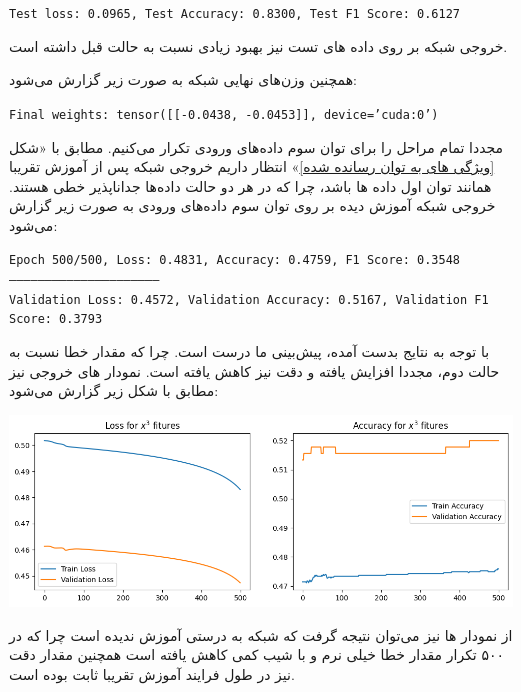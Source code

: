 \begin{enumerate}
\begin{qsolve}
		\begin{latin}
			\texttt{Test loss: 0.0965, Test Accuracy: 0.8300, Test F1 Score: 0.6127}\\
		\end{latin}
		
		خروجی شبکه بر روی داده های تست نیز بهبود زیادی نسبت به حالت قبل داشته است.
		
		همچنین وزن‌های نهایی شبکه به صورت زیر گزارش می‌شود:
		\begin{latin}
			\texttt{Final weights: tensor([[-0.0438, -0.0453]], device='cuda:0')}\\
		\end{latin}
		
		
		مجددا تمام مراحل را برای توان سوم داده‌های ورودی تکرار می‌کنیم. مطابق با «شکل \ref{ویژگی های به توان رسانده شده}» انتظار داریم خروجی شبکه پس از آموزش تقریبا همانند توان اول داده ها باشد، چرا که در هر دو حالت داده‌ها جداناپذیر خطی هستند. خروجی شبکه آموزش دیده بر روی توان سوم داده‌های ورودی به صورت زیر گزارش می‌شود:
		
		\begin{latin}
			\texttt{Epoch 500/500, Loss: 0.4831, Accuracy: 0.4759, F1 Score: 0.3548}\\
			\texttt{---------------------------------------------------------------}\\
			\texttt{Validation Loss: 0.4572, Validation Accuracy: 0.5167, Validation F1 Score: 0.3793}
		\end{latin}
		
		با توجه به نتایج بدست آمده، پیش‌بینی ما درست است. چرا که مقدار خطا نسبت به حالت دوم، مجددا افزایش یافته و دقت نیز کاهش یافته است. نمودار های خروجی نیز مطابق با شکل زیر گزارش می‌شود:
		
		\begin{center}
			\includegraphics*[width=1\linewidth]{pics/img13.png}
			\label{نمودار‌های خطا و دقت ۳}
		\end{center}
		
		از نمودار ها نیز می‌توان نتیجه گرفت که شبکه به درستی آموزش ندیده است چرا که در ۵۰۰ تکرار مقدار خطا خیلی نرم و با شیب کمی کاهش یافته است همچنین مقدار دقت نیز در طول فرایند آموزش تقریبا ثابت بوده است.
		

\end{qsolve}
\end{enumerate}
